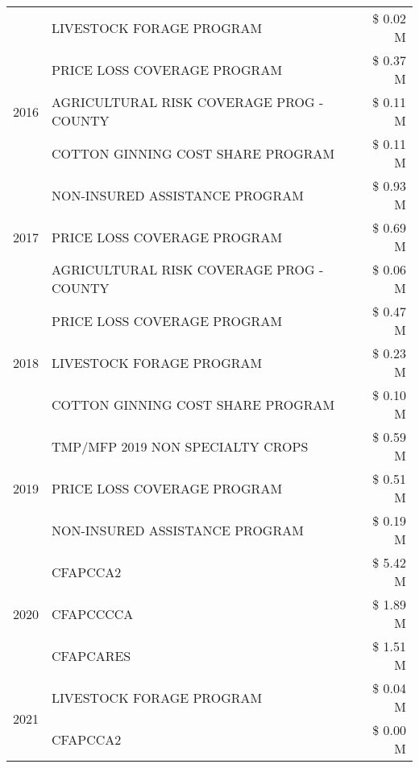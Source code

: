 \begin{tabular}{llr}
 & LIVESTOCK FORAGE PROGRAM & \$ 0.02 M \\
\cline{1-3}
\multirow[t]{3}{*}{2016} & PRICE LOSS COVERAGE PROGRAM & \$ 0.37 M \\
 & AGRICULTURAL RISK COVERAGE PROG - COUNTY & \$ 0.11 M \\
 & COTTON GINNING COST SHARE PROGRAM & \$ 0.11 M \\
\cline{1-3}
\multirow[t]{3}{*}{2017} & NON-INSURED ASSISTANCE PROGRAM & \$ 0.93 M \\
 & PRICE LOSS COVERAGE PROGRAM & \$ 0.69 M \\
 & AGRICULTURAL RISK COVERAGE PROG - COUNTY & \$ 0.06 M \\
\cline{1-3}
\multirow[t]{3}{*}{2018} & PRICE LOSS COVERAGE PROGRAM & \$ 0.47 M \\
 & LIVESTOCK FORAGE PROGRAM & \$ 0.23 M \\
 & COTTON GINNING COST SHARE PROGRAM & \$ 0.10 M \\
\cline{1-3}
\multirow[t]{3}{*}{2019} & TMP/MFP 2019 NON SPECIALTY CROPS & \$ 0.59 M \\
 & PRICE LOSS COVERAGE PROGRAM & \$ 0.51 M \\
 & NON-INSURED ASSISTANCE PROGRAM & \$ 0.19 M \\
\cline{1-3}
\multirow[t]{3}{*}{2020} & CFAPCCA2 & \$ 5.42 M \\
 & CFAPCCCCA & \$ 1.89 M \\
 & CFAPCARES & \$ 1.51 M \\
\cline{1-3}
\multirow[t]{2}{*}{2021} & LIVESTOCK FORAGE PROGRAM & \$ 0.04 M \\
 & CFAPCCA2 & \$ 0.00 M \\
\cline{1-3}
\bottomrule
\end{tabular}
